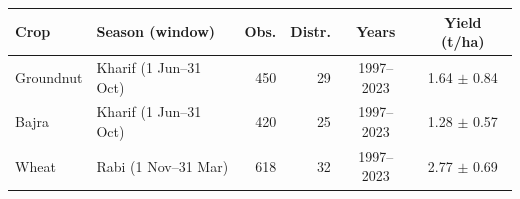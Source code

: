 \begin{tabular}{llrrcc}
\toprule
Crop & Season (window) & Obs. & Distr. & Years & Yield (t/ha) \\
\midrule
Groundnut & Kharif (1 Jun--31 Oct) & 450 & 29 & 1997--2023 & 1.64 $\pm$ 0.84 \\
Bajra & Kharif (1 Jun--31 Oct) & 420 & 25 & 1997--2023 & 1.28 $\pm$ 0.57 \\
Wheat & Rabi (1 Nov--31 Mar) & 618 & 32 & 1997--2023 & 2.77 $\pm$ 0.69 \\
\bottomrule
\end{tabular}
